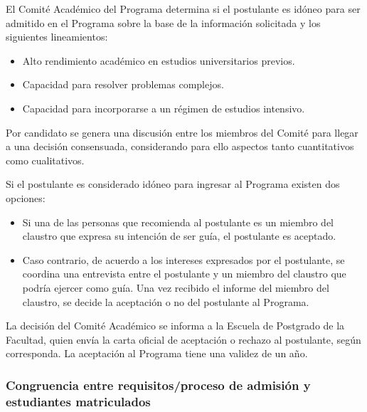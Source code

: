 
El Comité Académico del Programa determina si el postulante es idóneo para ser admitido en
el Programa sobre la base de la información solicitada y los siguientes lineamientos:

\begin{itemize}
\item Alto rendimiento académico en estudios universitarios previos.
\item Capacidad para resolver problemas complejos.
\item Capacidad para incorporarse a un régimen de estudios intensivo.
\end{itemize}

Por candidato se genera una discusión entre los miembros del Comité para llegar a una decisión
consensuada, considerando para ello aspectos tanto cuantitativos como cualitativos.

Si el postulante es considerado idóneo para ingresar al Programa existen dos opciones:

\begin{itemize}
\item Si una de las personas que recomienda al postulante es un miembro del claustro que expresa
su intención de ser guía, el postulante es aceptado.
\item Caso contrario, de acuerdo a los intereses expresados por el postulante, se coordina una
entrevista entre el postulante y un miembro del claustro que podría ejercer como guía. Una
vez recibido el informe del miembro del claustro, se decide la aceptación o no del postulante
al Programa.
\end{itemize}

La decisión del Comité Académico se informa a la Escuela de Postgrado de la Facultad, quien
envía la carta oficial de aceptación o rechazo al postulante, según corresponda. La aceptación al
Programa tiene una validez de un año.

\subsubsection{Congruencia entre requisitos/proceso de admisión y estudiantes matriculados}

